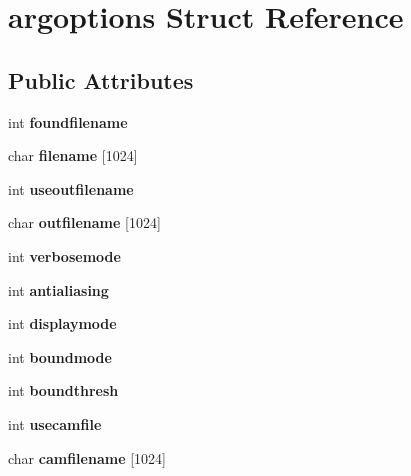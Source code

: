 \hypertarget{structargoptions}{}\section{argoptions Struct Reference}
\label{structargoptions}
\subsection*{Public Attributes}
\begin{DoxyCompactItemize}
\item 
\hypertarget{structargoptions_ad1c2a9f518032097e66ca0d8ad9ef148}{}int {\bfseries foundfilename}\label{structargoptions_ad1c2a9f518032097e66ca0d8ad9ef148}

\item 
\hypertarget{structargoptions_ade5e2add9cc3385c44122c34af0b84b8}{}char {\bfseries filename} \mbox{[}1024\mbox{]}\label{structargoptions_ade5e2add9cc3385c44122c34af0b84b8}

\item 
\hypertarget{structargoptions_a29c788281bc6caf3e9e735af772ecf31}{}int {\bfseries useoutfilename}\label{structargoptions_a29c788281bc6caf3e9e735af772ecf31}

\item 
\hypertarget{structargoptions_a52df0af0a957242e0c46268bc4fa9c58}{}char {\bfseries outfilename} \mbox{[}1024\mbox{]}\label{structargoptions_a52df0af0a957242e0c46268bc4fa9c58}

\item 
\hypertarget{structargoptions_a97826751b1d8c5628300f279435f5e43}{}int {\bfseries verbosemode}\label{structargoptions_a97826751b1d8c5628300f279435f5e43}

\item 
\hypertarget{structargoptions_acd882d1e08d8bfd310974379e2b1e3a8}{}int {\bfseries antialiasing}\label{structargoptions_acd882d1e08d8bfd310974379e2b1e3a8}

\item 
\hypertarget{structargoptions_a6e95da7f0488a437b60235dfd13967ac}{}int {\bfseries displaymode}\label{structargoptions_a6e95da7f0488a437b60235dfd13967ac}

\item 
\hypertarget{structargoptions_a1395795eefed38f1f37fafdc021e6dc5}{}int {\bfseries boundmode}\label{structargoptions_a1395795eefed38f1f37fafdc021e6dc5}

\item 
\hypertarget{structargoptions_a674ac581907e0e51deec33fade1a2ea0}{}int {\bfseries boundthresh}\label{structargoptions_a674ac581907e0e51deec33fade1a2ea0}

\item 
\hypertarget{structargoptions_a7931c9d235d259c36b438eb8b1231d98}{}int {\bfseries usecamfile}\label{structargoptions_a7931c9d235d259c36b438eb8b1231d98}

\item 
\hypertarget{structargoptions_a70d18043f619c737a96fc374df5f8548}{}char {\bfseries camfilename} \mbox{[}1024\mbox{]}\label{structargoptions_a70d18043f619c737a96fc374df5f8548}

\end{DoxyCompactItemize}


